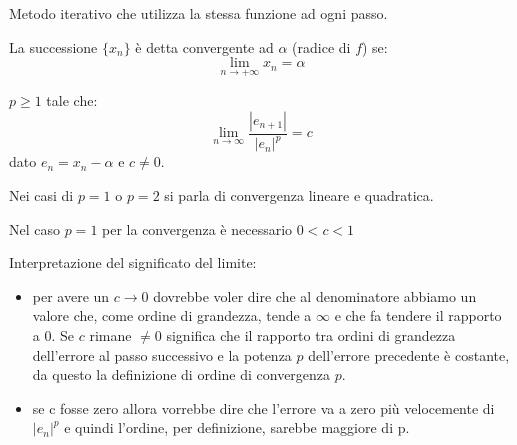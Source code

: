 \documentclass[12pt,a4paper,]{report}
\begin{document}
\begin{definizione}
    Metodo iterativo che utilizza la stessa funzione ad ogni passo.
\end{definizione}
\begin{definizione}
    La successione $\{x_n\}$ è detta convergente ad $\alpha$ (radice di $f$) se:
    \[
    \lim_{n\to+\infty} x_n = \alpha
    \]
\end{definizione}
\begin{definizione}
    $p\geq 1$ tale che:
    \[
    \lim_{n\to\infty} \frac{|e_{n+1}|}{|e_n|^p}=c
    \]
    dato $e_n = x_n -\alpha$ e $c\neq 0$.
\end{definizione}
\begin{nota}
    Nei casi di $p=1$ o $p = 2$ si parla di convergenza lineare e quadratica.
\end{nota}
\begin{nota}
    Nel caso $p = 1$ per la convergenza è necessario $0<c<1$
\end{nota}
\begin{nota}
    Interpretazione del significato del limite:
    \begin{itemize}
        \item per avere un $c\to 0$ dovrebbe voler dire che al denominatore abbiamo un valore che, come ordine di grandezza, tende a $\infty$ e che fa tendere il rapporto a $0$. Se $c$ rimane $\ne 0$ significa che il rapporto tra ordini di grandezza dell'errore al passo successivo e la potenza $p$ dell'errore precedente è costante, da questo la definizione di ordine di convergenza $p$.
        \item se c fosse zero allora vorrebbe dire che l'errore va a zero più velocemente di $|e_n|^p$ e quindi l'ordine, per definizione, sarebbe maggiore di p.
    \end{itemize}
\end{nota}
\end{document}
